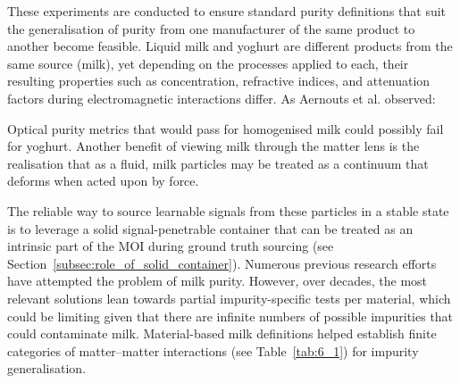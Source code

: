 \documentclass[12pt,a4paper,oneside]{report}
\begin{document}
These experiments are conducted to ensure standard purity definitions that suit the generalisation of purity from one manufacturer of the same product to another become feasible. Liquid milk and yoghurt are different products from the same source (milk), yet depending on the processes applied to each, their resulting properties such as concentration, refractive indices, and attenuation \cite{gravert1968} factors during electromagnetic interactions differ. As Aernouts et al. observed:

\vspace{1cm}
\noindent\begin{minipage}{\textwidth}
\setlength{\parindent}{0pt}%
\setlength{\leftskip}{0pt}%
\setlength{\rightskip}{0pt}%
\setlength{\emergencystretch}{3em}%
%
\footnotesize%
\ttfamily%
\color{textgrey}%
\justifying%
\sloppy%
\noindent\quoteseven
\end{minipage}

Optical purity metrics that would pass for homogenised milk could possibly fail for yoghurt. Another benefit of viewing milk through the matter lens is the realisation that as a fluid, milk particles may be treated as a continuum that deforms when acted upon by force.

The reliable way to source learnable signals from these particles in a stable state is to leverage a solid signal-penetrable container that can be treated as an intrinsic part of the MOI during ground truth sourcing (see Section~\ref{subsec:role_of_solid_container}). Numerous previous research efforts have attempted the problem of milk purity. However, over decades, the most relevant solutions lean towards partial impurity-specific tests per material, which could be limiting given that there are infinite numbers of possible impurities that could contaminate milk. Material-based milk definitions helped establish finite categories of matter--matter interactions (see Table~\ref{tab:6_1}) for impurity generalisation.
\end{document}
